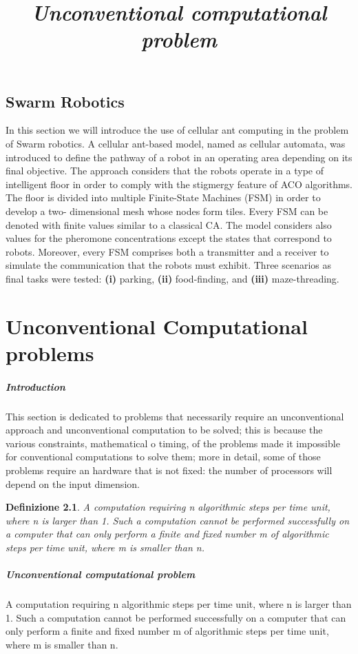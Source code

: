 \documentclass[12pt,a4paper]{report}
\newtheorem{definizione}{Definizione}[section]
\begin{document}
\section{Swarm Robotics}
In this section we will introduce the use of cellular ant computing in the problem of Swarm robotics. A cellular ant-based model, named as cellular automata, was introduced to define the pathway of a robot in an operating area depending on its final objective. The approach considers that the robots operate in a type of intelligent floor in order to comply with the stigmergy feature of ACO algorithms. The floor is divided into multiple Finite-State Machines (FSM) in order to develop a two- dimensional mesh whose nodes form tiles. Every FSM can be denoted with finite values similar to a classical CA. The model considers also values for the pheromone concentrations except the states that correspond to robots. Moreover, every FSM comprises both a transmitter and a receiver to simulate the communication that the robots must exhibit. Three scenarios as final tasks were tested: \textbf{(i)} parking, \textbf{(ii)} food-finding, and \textbf{(iii)} maze-threading.

\chapter{Unconventional Computational problems}
\paragraph{Introduction}
This section is dedicated to problems that necessarily require an unconventional approach and unconventional computation to be solved; this is because the various constraints, mathematical o timing, of the problems made it impossible for conventional computations to solve them; more in detail, some of those problems require an hardware that is not fixed: the number of processors will depend on the input dimension.

\begin{definizione}
\title{\emph{Unconventional computational problem}}

A computation requiring n algorithmic steps per time unit, where n is larger than 1. Such a computation cannot be performed successfully on a computer that can only perform a finite and fixed number m of algorithmic steps per time unit, where m is smaller than n.
\end{definizione}

\paragraph{Unconventional computational problem}
A computation requiring n algorithmic steps per time unit, where n is larger than 1. Such a computation cannot be performed successfully on a computer that can only perform a finite and fixed number m of algorithmic steps per time unit, where m is smaller than n.
\end{document}
